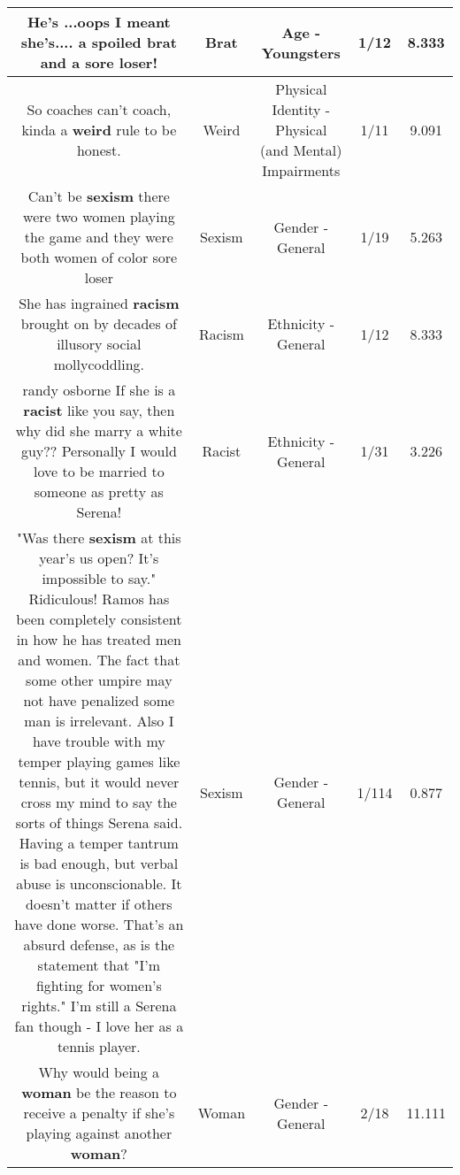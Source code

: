 \documentclass[11pt]{article}
\newlength\mylength
\begin{document}
\begin{center}
\begin{longtable}{|C{.65\mylength}|C{.30\mylength}|C{.12\mylength}|C{.12\mylength}|C{.12\mylength}|}
  \small He's ...oops I meant she's.... a spoiled \textbf{brat} and a sore loser!\normalsize   & Brat & Age - Youngsters & 1/12 & 8.333 \\  \hline
  \small So coaches can't coach, kinda a \textbf{weird} rule to be honest.\normalsize   & Weird & Physical Identity - Physical (and Mental) Impairments & 1/11 & 9.091 \\  \hline
  \small Can't be \textbf{sexism} there were two women playing the game and they were both women of color sore loser\normalsize   & Sexism & Gender - General & 1/19 & 5.263 \\  \hline
  \small She has ingrained \textbf{racism} brought on by decades of illusory social mollycoddling.\normalsize   & Racism & Ethnicity - General & 1/12 & 8.333 \\  \hline
  \small randy osborne If she is a \textbf{racist} like you say, then why did she marry a white guy??  Personally I would love to be married to someone as pretty as Serena!\normalsize   & Racist & Ethnicity - General & 1/31 & 3.226 \\  \hline
  \small "Was there \textbf{sexism} at this year's us open? It's impossible to say." Ridiculous! Ramos has been completely consistent in how he has treated men and women. The fact that some other umpire may not have penalized some man is irrelevant. Also I have trouble with my temper playing games like tennis, but it would never cross my mind to say the sorts of things Serena said. Having a temper tantrum is bad enough, but verbal abuse is unconscionable. It doesn't matter if others have done worse. That's an absurd defense, as is the statement that "I'm fighting for women's rights." I'm still a Serena fan though - I love her as a tennis player.\normalsize   & Sexism & Gender - General & 1/114 & 0.877 \\  \hline
  \small Why would being a \textbf{woman} be the reason to receive a penalty if she's playing against another \textbf{woman}?\normalsize   & Woman & Gender - General & 2/18 & 11.111 \\  \hline

\end{longtable}
\end{center}
\end{document}
